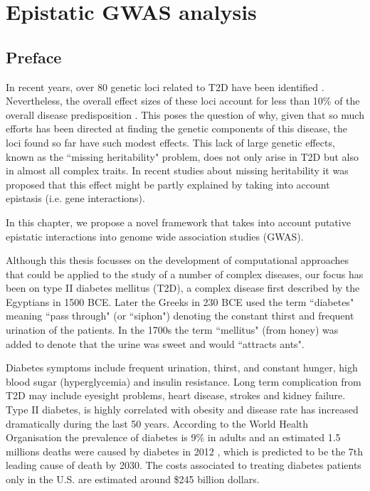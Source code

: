 
\chapter{Epistatic GWAS analysis\label{ch:gwas}}

\section{Preface}

In recent years, over 80 genetic loci related to T2D have been identified \cite{morris2012large, consortium2014genome}. Nevertheless, the overall effect sizes of these loci account for less than 10\% of the overall disease predisposition \cite{manolio2009finding}. This poses the question of why, given that so much efforts has been directed at finding the genetic components of this disease, the loci found so far have such modest effects. This lack of large genetic effects, known as the ``missing heritability" problem, does not only arise in T2D but also in almost all complex traits. In recent studies about missing heritability \cite{zuk2012mystery, zuk2014searching} it was proposed that this effect might be partly explained by taking into account epistasis (i.e. gene interactions).

In this chapter, we propose a novel framework that takes into account putative epistatic interactions into genome wide association studies (GWAS). 

Although this thesis focusses on the development of computational approaches that could be applied to the study of a number of complex diseases, our focus has been on type II diabetes mellitus (T2D), a complex disease first described by the Egyptians in 1500 BCE. Later the Greeks in 230 BCE used the term ``diabetes" meaning ``pass through" (or ``siphon") denoting the constant thirst and frequent urination of the patients. In the 1700s the term ``mellitus" (from honey) was added to denote that the urine was sweet and would ``attracts ants".

Diabetes symptoms include frequent urination, thirst, and constant hunger, high blood sugar (hyperglycemia) and insulin resistance. Long term complication from T2D may include eyesight problems, heart disease, strokes and kidney failure. Type II diabetes, is highly correlated with obesity and disease rate has increased dramatically during the last 50 years. According to the World Health Organisation the prevalence of diabetes is 9\% in adults and an estimated 1.5 millions deaths were caused by diabetes in 2012 \cite{guariguata2014global}, which is predicted to be the 7th leading cause of death by 2030. The costs associated to treating diabetes patients only in the U.S. are estimated around \$245 billion dollars.

